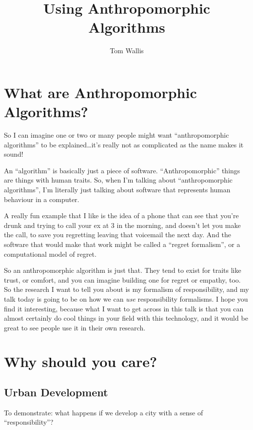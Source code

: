 \documentclass[draft]{tufte-handout}
\author{Tom Wallis}
\title{Using Anthropomorphic Algorithms}
\date{}
\begin{document}
\maketitle

\section{What are Anthropomorphic Algorithms?}
So I can imagine one or two or many people might want ``anthropomorphic algorithms'' to be explained\ldots{}it's really not as complicated as the name makes it sound!\par

An ``algorithm'' is basically just a piece of software. ``Anthropomorphic'' things are things with human traits. So, when I'm talking about ``anthropomorphic algorithms'', I'm literally just talking about software that represents human behaviour in a computer.\par

A really fun example that I like is the idea of a phone that can see that you're drunk and trying to call your ex at 3 in the morning, and doesn't let you make the call, to save you regretting leaving that voicemail the next day. And the software that would make that work might be called a ``regret formalism'', or a computational model of regret.\par

So an anthropomorphic algorithm is just that. They tend to exist for traits like trust, or comfort, and you can imagine building one for regret or empathy, too. So the research I want to tell you about is my formalism of responsibility, and my talk today is going to be on how we can \emph{use} responsibility formalisms. I hope you find it interesting, because what I want to get across in this talk is that you can almost certainly do cool things in your field with this technology, and it would be great to see people use it in their own research.

\section{Why should you care?}
\subsection{Urban Development}
To demonstrate: what happens if we develop a city with a sense of ``responsibility''?
\end{document}
